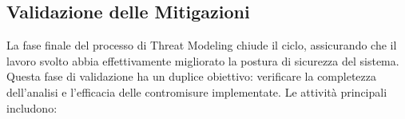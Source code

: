 


\subsection{Validazione delle Mitigazioni}



La fase finale del processo di Threat Modeling chiude il ciclo, assicurando che il lavoro svolto abbia effettivamente migliorato la postura di sicurezza del sistema. Questa fase di validazione ha un duplice obiettivo: verificare la completezza dell'analisi e l'efficacia delle contromisure implementate. Le attività principali includono:

